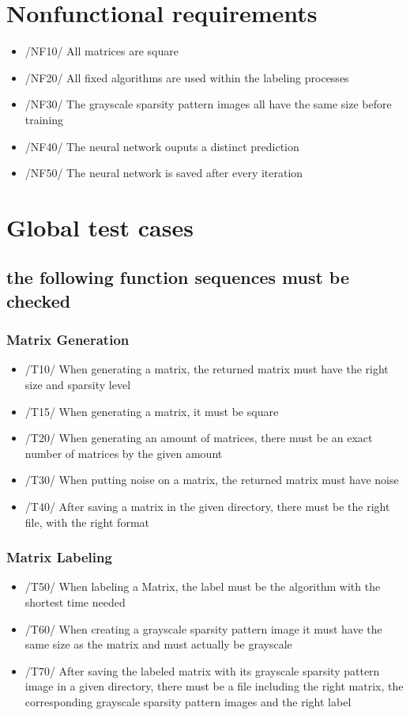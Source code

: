 \documentclass[parskip=full]{scrartcl}
\begin{document}
\section{Nonfunctional requirements}
	\begin{itemize}
		\item /NF10/ All matrices are square
		\item /NF20/ All fixed \glspl{algorithm} are used within the labeling processes
		\item /NF30/ The \glspl{grayscale sparsity pattern image} all have the same size before training
		\item /NF40/ The \gls{neural network} ouputs a distinct prediction
		\item /NF50/ The \gls{neural network} is saved after every iteration
	\end{itemize}
	

\section{Global test cases}
\subsection{the following function sequences must be checked}
\subsubsection{Matrix Generation}
	\begin{itemize}
		\item /T10/ When generating a matrix, the returned matrix must have the right size and sparsity level
		\item /T15/ When generating a matrix, it must be square
		\item /T20/ When generating an amount of matrices, there must be an exact number of matrices by the given amount
		\item /T30/ When putting noise on a matrix, the returned matrix must have noise
		\item /T40/ After saving a matrix in the given directory, there must be the right file, with the right format
	\end{itemize}

\subsubsection{Matrix Labeling}
		\begin{itemize}
		\item /T50/ When labeling a Matrix, the label must be the \gls{algorithm} with the shortest time needed
		\item /T60/ When creating a \gls{grayscale sparsity pattern image} it must have the same size as
                       the matrix and must actually be grayscale
		\item /T70/ After saving the labeled matrix with its \gls{grayscale sparsity pattern image} in a given directory, there must be a file including the right matrix, the corresponding \glspl{grayscale sparsity pattern image} and the right label
		\end{itemize}
\end{document}

